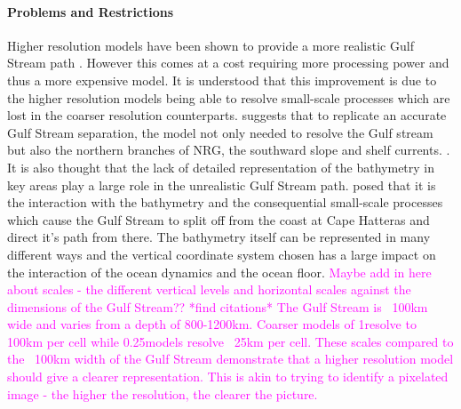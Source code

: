 \documentclass[..\EOYR.tex]{subfiles}
\begin{document}
\paragraph{Problems and Restrictions}
Higher resolution models have been shown to provide a more realistic Gulf Stream path . However this comes at a cost requiring more processing power and thus a more expensive model. 
It is understood  that this improvement is due to the higher resolution models being able to resolve small-scale processes which are lost in the coarser resolution counterparts. 
\citep{Ezer2016b} suggests that to replicate an accurate Gulf Stream separation, the model not only needed to resolve the Gulf stream but also the northern branches of NRG, the southward slope and shelf currents. .
 It is also thought that the lack of detailed representation of the bathymetry in key areas play a large role in the unrealistic Gulf Stream path.
 posed that it is the interaction with the bathymetry and the consequential small-scale processes which cause the Gulf Stream to split off from the coast at Cape Hatteras and direct it's path from there.
The bathymetry itself can be represented in many different ways and the vertical coordinate system chosen has a large impact on the interaction of the ocean dynamics and the ocean floor. 
\textcolor{magenta}{Maybe add in here about scales - the different vertical levels and horizontal scales against the dimensions of the Gulf Stream?? *find citations* The Gulf Stream is ~100km wide and varies from a depth of 800-1200km. Coarser models of 1\degree resolve to 100km per cell while 0.25\degree models resolve ~25km per cell. These scales compared to the ~100km width of the Gulf Stream demonstrate that a higher resolution model should give a clearer representation. This is akin to trying to identify a pixelated image - the higher the resolution, the clearer the picture.}
\end{document}
